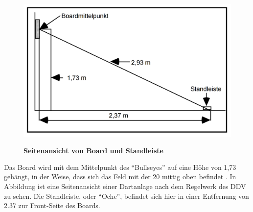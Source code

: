 \begin{figure}
\includegraphics[width=\textwidth]{media/Dartsfield}\\
\caption{\textbf{Seitenansicht von Board und Standleiste 
\cite[8]{DartsRegel2016}}
}
\label{Fig:dartsetup}
\end{figure}


Das Board wird mit dem Mittelpunkt des "`Bullseyes"' auf eine Höhe von 1,73 gehängt, in der Weise, dass sich das Feld mit der 20 mittig oben befindet \autocite[6-8]{DartsRegel2016}. In Abbildung  ist eine Seitenansicht einer Dartanlage nach dem Regelwerk des DDV zu sehen. Die Standleiste, oder "`Oche"', befindet sich hier in einer Entfernung von 2.37 zur Front-Seite des Boards. 

